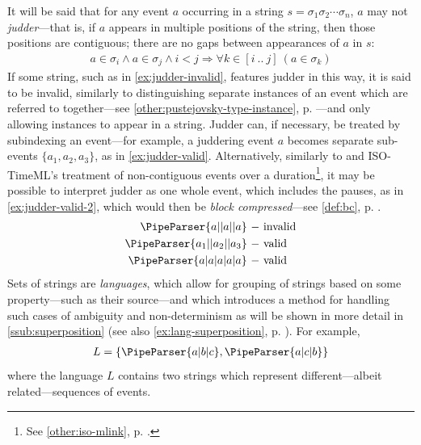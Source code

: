 \documentclass[a4paper,12pt,leqno]{article}
\newcommand{\vph}[1]{\vphantom{#1}}
\newcommand{\ebox}[1]{\fbox{$\vph{'(),}#1$}}
\newcommand{\EventString}[1]{%
	\renewcommand*{\do}[1]{\ebox{##1}}%
	\PipeParser{#1}%
}
\begin{document}
It will be said that for any event $a$ occurring in a string $s = \sigma_1\sigma_2\cdots\sigma_n$, $a$ may not \textit{judder}---that is, if $a$ appears in multiple positions of the string, then those positions are contiguous; there are no gaps between appearances of $a$ in $s$:
\begin{align}\label{impl:contiguous-events}
	a \in \sigma_i \wedge a \in \sigma_j \wedge i < j \Longrightarrow \forall k \in [i~..~j]~(a \in \sigma_k)
\end{align}
If some string, such as in \cref{ex:judder-invalid}, features judder in this way, it is said to be invalid, similarly to \citet[p. 134]{Pustejovsky2005} distinguishing separate instances of an event which are referred to together---see \cref{other:pustejovsky-type-instance}, p. \pageref{other:pustejovsky-type-instance}---and only allowing instances to appear in a string. Judder can, if necessary, be treated by subindexing an event---for example, a juddering event $a$ becomes separate sub-events $\{a_1, a_2, a_3\}$, as in \cref{ex:judder-valid}. Alternatively, similarly to \citet{bunt2010annotating} and ISO-TimeML's treatment of non-contiguous events over a duration\footnote{See \cref{other:iso-mlink}, p. \pageref{other:iso-mlink}.}, it may be possible to interpret judder as one whole event, which includes the pauses, as in \cref{ex:judder-valid-2}, which would then be \textit{block compressed}---see \cref{def:bc}, p. \pageref{def:bc}.
\begin{subequations}\label{ex:judder}
	\begin{align}
		\EventString{a|{}|a|{}|a}\label{ex:judder-invalid} ~-~& \text{invalid}\\
		\EventString{a_1|{}|a_2|{}|a_3}\label{ex:judder-valid} ~-~& \text{valid}\\
		\EventString{a|a|a|a|a}\label{ex:judder-valid-2} ~-~& \text{valid}
	\end{align}
\end{subequations}
Sets of strings are \textit{languages}, which allow for grouping of strings based on some property---such as their source---and which introduces a method for handling such cases of ambiguity and non-determinism as will be shown in more detail in \cref{ssub:superposition} (see also \cref{ex:lang-superposition}, p. \pageref{ex:lang-superposition}). For example,
\begin{align}
	L = \{\EventString{a|b|c}, \EventString{a|c|b}\}
\end{align}
where the language $L$ contains two strings which represent different---albeit related---sequences of events.
\end{document}
